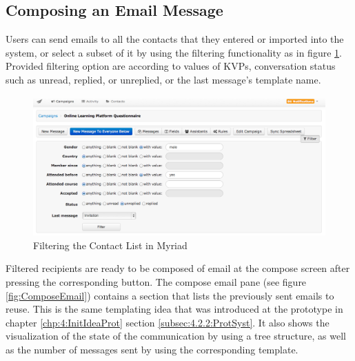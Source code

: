 \subsection{Composing an Email Message}
\label{subsec:5.2.4:CompEmaiMess}

Users can send emails to all the contacts that they entered or imported into the system, or select a subset of it by using the filtering functionality as in figure \ref{fig:ContactFilters}. Provided filtering option are according to values of \ac{KVP}s, conversation status such as unread, replied, or unreplied, or the last message's template name.

\begin{figure}[htbp]
	\centering
	\includegraphics[width=1.00\textwidth]{imgs/ContactFilters.png}
	\caption[Filtering the Contact List in Myriad]{Filtering the Contact List in Myriad}
	\label{fig:ContactFilters}
\end{figure}

Filtered recipients are ready to be composed of email at the compose screen after pressing the corresponding button. The compose email pane (see figure \ref{fig:ComposeEmail}) contains a section that lists the previously sent emails to reuse. This is the same templating idea that was introduced at the prototype in chapter \ref{chp:4:InitIdeaProt} section \ref{subsec:4.2.2:ProtSyst}. It also shows the visualization of the state of the communication by using a tree structure, as well as the number of messages sent by using the corresponding template.

